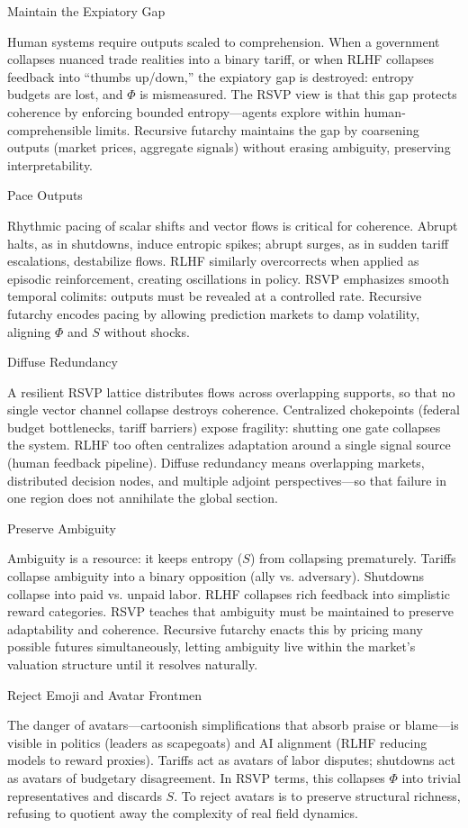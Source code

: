 \documentclass{article}
\begin{document}
Maintain the Expiatory Gap

Human systems require outputs scaled to comprehension. When a government collapses nuanced trade realities into a binary tariff, or when RLHF collapses feedback into “thumbs up/down,” the expiatory gap is destroyed: entropy budgets are lost, and $\Phi$ is mismeasured. The RSVP view is that this gap protects coherence by enforcing bounded entropy—agents explore within human-comprehensible limits. Recursive futarchy maintains the gap by coarsening outputs (market prices, aggregate signals) without erasing ambiguity, preserving interpretability.

Pace Outputs

Rhythmic pacing of scalar shifts and vector flows is critical for coherence. Abrupt halts, as in shutdowns, induce entropic spikes; abrupt surges, as in sudden tariff escalations, destabilize flows. RLHF similarly overcorrects when applied as episodic reinforcement, creating oscillations in policy. RSVP emphasizes smooth temporal colimits: outputs must be revealed at a controlled rate. Recursive futarchy encodes pacing by allowing prediction markets to damp volatility, aligning $\Phi$ and $S$ without shocks.

Diffuse Redundancy

A resilient RSVP lattice distributes flows across overlapping supports, so that no single vector channel collapse destroys coherence. Centralized chokepoints (federal budget bottlenecks, tariff barriers) expose fragility: shutting one gate collapses the system. RLHF too often centralizes adaptation around a single signal source (human feedback pipeline). Diffuse redundancy means overlapping markets, distributed decision nodes, and multiple adjoint perspectives—so that failure in one region does not annihilate the global section.

Preserve Ambiguity

Ambiguity is a resource: it keeps entropy ($S$) from collapsing prematurely. Tariffs collapse ambiguity into a binary opposition (ally vs. adversary). Shutdowns collapse into paid vs. unpaid labor. RLHF collapses rich feedback into simplistic reward categories. RSVP teaches that ambiguity must be maintained to preserve adaptability and coherence. Recursive futarchy enacts this by pricing many possible futures simultaneously, letting ambiguity live within the market’s valuation structure until it resolves naturally.

Reject Emoji and Avatar Frontmen

The danger of avatars—cartoonish simplifications that absorb praise or blame—is visible in politics (leaders as scapegoats) and AI alignment (RLHF reducing models to reward proxies). Tariffs act as avatars of labor disputes; shutdowns act as avatars of budgetary disagreement. In RSVP terms, this collapses $\Phi$ into trivial representatives and discards $S$. To reject avatars is to preserve structural richness, refusing to quotient away the complexity of real field dynamics.
\end{document}
